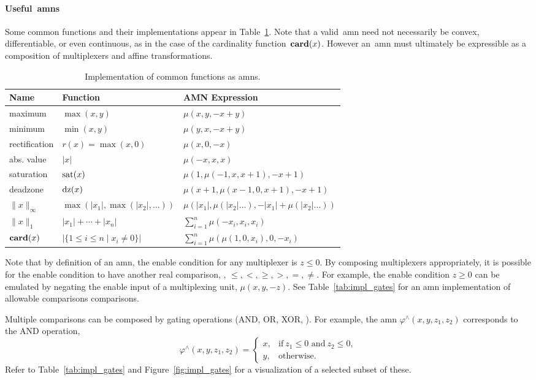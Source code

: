 \documentclass[10pt]{article}
\newcommand{\sat}{\mathop{\rm sat}}
\newcommand{\dz}{\mathop{\rm dz}}
\newcommand{\amn}{\varphi}
\newcommand{\card}{\mathop{\bf card}}
\theoremstyle{remark}
\theoremstyle{definition}
\theoremstyle{plain}
\begin{document}
\paragraph{Useful~\acsp{amn}}
Some common functions and their implementations appear in
Table~\ref{tab:impl_pwl}. Note that a valid~\acs{amn} need not necessarily be
convex, differentiable, or even continuous, as in the case of the cardinality
function~$\card(x)$. However an~\acs{amn} must ultimately be expressible as a
composition of multiplexers and affine transformations.
\begin{table}[hbtp]
	\centering
	\begin{tabular}{l|l|l}
		\textbf{Name} & \textbf{Function} & \textbf{AMN Expression}\\
		\hline
		maximum & $\max(x,y)$ & $\mu(x,y,-x+y)$\\
		minimum & $\min(x,y)$ & $\mu(y,x,-x+y)$\\
		rectification & $r(x)=\max(x,0)$ & $\mu(x,0,-x)$\\
		abs. value & $|x|$ & $\mu(-x,x,x)$\\
		saturation & $\sat(x)$ & $\mu(1,\mu(-1,x,x+1),-x+1)$\\
		deadzone & $\dz(x)$ & $\mu(x+1,\mu(x-1,0,x+1),-x+1)$\\
		$\|x\|_\infty$ & $\max(|x_1|,\max(|x_2|,\ldots))$ & $\mu(|x_1|,\mu(|x_2|\ldots),-|x_1|+\mu(|x_2|\ldots))$\\
		$\|x\|_1$ & $|x_1| + \cdots + |x_n|$ & $\sum_{i=1}^{n} \mu(-x_i, x_i, x_i)$\\
		$\card(x)$ & $|\{1\leq i\leq n \mid x_i \neq 0\}|$ & $\sum_{i=1}^{n}\mu(\mu(1,0,x_i),0,-x_i)$
	\end{tabular}
	\caption{Implementation of common functions as \aclp{amn}.}
	\label{tab:impl_pwl}
\end{table}

Note that by definition of an \acs{amn}, the enable condition for any
multiplexer is $z\leq 0$.  By composing multiplexers appropriately, it is
possible for the enable condition to have another real comparison,
\eg, $\leq, <, \geq, >, =, \neq$. For example, the enable condition $z \geq 0$
can be emulated by negating the enable input of a multiplexing unit, $\mu(x, y,
-z)$.  See Table~\ref{tab:impl_gates} for an \acs{amn} implementation of
allowable comparisons comparisons.

Multiple comparisons can be composed by gating operations (AND,
OR, XOR, \etc). For example, the \acs{amn} $\amn^\wedge(x,y,z_1,z_2)$
corresponds to the AND operation,
\[
	\amn^\wedge(x,y,z_1,z_2)
	=
	\left\{
		\begin{array}{ll}
			x, & \text{if}~z_1\leq 0 \text{ and}~z_2\leq 0,\\
			y, & \text{otherwise}.
		\end{array}
	\right.
\]
Refer to Table~\ref{tab:impl_gates} and Figure~\ref{fig:impl_gates} for a
visualization of a selected subset of these.
\end{document}
